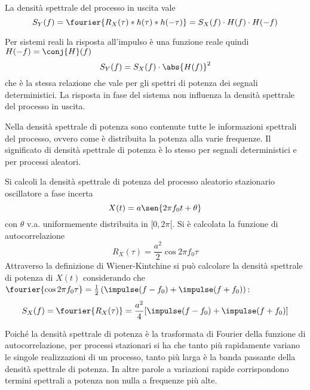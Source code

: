 La densità spettrale del processo in uscita vale
\begin{equation}
	S_Y(f)=\fourier{R_X(\tau)\ast h(\tau)\ast h(-\tau)}=S_X(f)\cdot H(f)\cdot H(-f)
\end{equation}

Per sistemi reali la risposta all'impulso è una funzione reale quindi $H(-f)=\conj{H}(f)$
\begin{equation}
	S_Y(f)=S_X(f)\cdot\abs{H(f)}^2
\end{equation}
che è la stessa relazione che vale per gli spettri di potenza dei segnali deterministici.
La risposta in fase del sistema non influenza la densità spettrale del processo in uscita.

Nella densità spettrale di potenza sono contenute tutte le informazioni spettrali del processo, ovvero come è distribuita la potenza alla varie frequenze. Il significato di densità spettrale di potenza è lo stesso per segnali deterministici e per processi aleatori.

\begin{esempio}
Si calcoli la densità spettrale di potenza del processo aleatorio stazionario oscillatore a fase incerta
\[
	X(t)=a\sen{2\pi f_0 t+\theta}
\]
con $\theta$ v.a. uniformemente distribuita in $[0,2\pi[$. Si è calcolata la funzione di autocorrelazione
\[
	R_X(\tau)=\frac{a^2}{2}\cos{2\pi f_0\tau}
\]
Attraverso la definizione di Wiener-Kintchine si può calcolare la densità spettrale di potenza di $X(t)$ considerando che $\fourier{\cos{2\pi f_0\tau}}=\frac{1}{2}\left(\impulse(f-f_0)+\impulse(f+f_0)\right)$:
\[
	S_X(f)=\fourier{R_X(\tau)}=\frac{a^2}{4}[\impulse(f-f_0)+\impulse(f+f_0)]
\]
\begin{figure}[!ht]
	\centering
\end{figure}
\end{esempio}

\begin{nota}
	Poiché la densità spettrale di potenza è la trasformata di Fourier della funzione di autocorrelazione, per processi stazionari si ha che tanto più rapidamente variano le singole realizzazioni di un processo, tanto più larga è la banda passante della densità spettrale di potenza. In altre parole a variazioni rapide corrispondono termini spettrali a potenza non nulla a frequenze più alte.
\end{nota}

